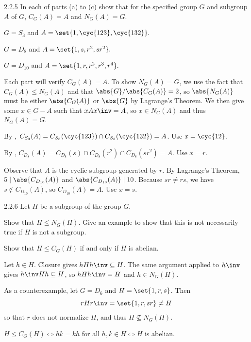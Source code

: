 \begin{exercise}{2.2.5}
    In each of parts (a) to (c) show that for the specified group $G$ and subgroup $A$ of $G$, $C_G(A)=A$ and $N_G(A)=G.$
    \begin{subexercises}
        \item $G=S_3$ and $A=\set{1,\cyc{1 2 3},\cyc{1 3 2}}.$
        \item $G=D_8$ and $A=\set{1, s, r^2, sr^2}.$
        \item $G=D_{10}$ and $A=\set{1,r,r^2,r^3,r^4}.$
    \end{subexercises}
\end{exercise}

\begin{sol}
    Each part will verify $C_G(A) = A$.
    To show $N_G(A) = G$, we use the fact that $C_G(A) \leq N_G(A)$ and that $\abs{G}/\abs{C_G(A)} = 2$, so $\abs{N_G(A)}$ must be either $\abs{C_G(A)}$ or $\abs{G}$ by Lagrange's Theorem.
    We then give some $x \in G - A$ such that $xAx\inv = A$, so $x \in N_G(A)$ and thus $N_G(A) = G$.
    \begin{subexercises}
        \item By , $C_{S_3}(A) = C_{S_3}(\cyc{1 2 3}) \cap C_{S_3}(\cyc{1 3 2}) = A$.
        Use $x = \cyc{1 2}$.
        \item By , $C_{D_8}(A) = C_{D_8}(s) \cap C_{D_8}(r^2) \cap C_{D_8}(sr^2) = A$.
        Use $x = r$.
        \item Observe that $A$ is the cyclic subgroup generated by $r$.
        By Lagrange's Theorem, $5 \mid \abs{C_{D_{10}}(A)}$ and $\abs{C_{D_{10}}(A)} \mid 10$.
        Because $sr \neq rs$, we have $s \notin C_{D_{10}}(A)$, so $C_{D_{10}}(A) = A$.
        Use $x = s$. \qedhere
    \end{subexercises}
\end{sol}

\begin{exercise}{2.2.6}
    Let $H$ be a subgroup of the group $G$.
    \begin{subexercises}
        \item Show that $H\leq N_G(H)$.
        Give an example to show that this is not necessarily true if $H$ is not a subgroup.
        \item Show that $H\leq C_G(H)$ if and only if $H$ is abelian.
    \end{subexercises}
\end{exercise}

\begin{solenum}
    \item Let $h \in H$.
    Closure gives $hHh\inv \subseteq H$.
    The same argument applied to $h\inv$ gives $h\inv Hh \subseteq H$, so $hHh\inv = H$ and $h \in N_G(H)$.

    As a counterexample, let $G = D_6$ and $H = \set{1, r, s}$.
	Then
    \[
    	rHr\inv = \set{1, r, sr} \neq H
    \]
    so that $r$ does not normalize $H$, and thus $H \nsubseteq N_G(H)$.
    \item $H \leq C_G(H) \iff hk = kh$ for all $h, k \in H \iff H$ is abelian.
\end{solenum}


